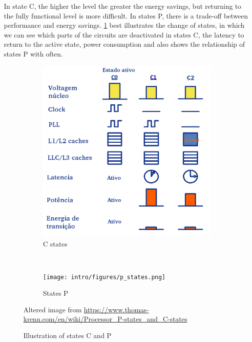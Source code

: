 In state C, the higher the level the greater the energy savings, but returning to the fully functional level is more difficult. In states P, there is a trade-off between performance and energy savings. \cref{fig:p_state} best illustrates the change of states, in which we can see which parts of the circuits are deactivated in states C, the latency to return to the active state, power consumption and also shows the relationship of states P with often.

\begin {figure} [H]
\centering
\begin{subfigure}[t]{0.5\textwidth}
	\centering
	\includegraphics[width=\columnwidth]{intro/figures/c_states.png}
	\caption{C states}
\end{subfigure}%
~
\begin{subfigure}[t]{0.5\textwidth}
	\centering
	\texttt{[image: intro/figures/p\_states.png]}
	\caption{States P}
\end{subfigure}
\caption {Illustration of states C and P} {Altered image from \protect \url {https://www.thomas-krenn.com/en/wiki/Processor_P-states_and_C-states}}
\label{fig:p_state}
\end{figure}



